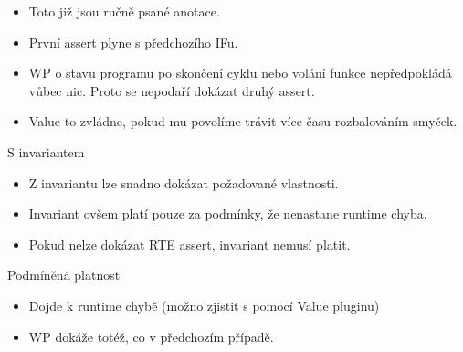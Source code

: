 \documentclass[11pt]{beamer}
\begin{document}
\begin{frame}
	\lstExIIwpItryI
	\begin{itemize}
		\item Toto již jsou ručně psané anotace.
		\item První assert plyne s předchozího IFu.
		\item WP o stavu programu po skončení cyklu nebo volání funkce nepředpokládá vůbec nic. Proto se nepodaří dokázat druhý assert.
		\pause \item Value to zvládne, pokud mu povolíme trávit více času rozbalováním smyček.
	\end{itemize}
\end{frame}


\begin{frame}{S invariantem}
	\lstExIIwpItryII
	\begin{itemize}
			\item Z invariantu lze snadno dokázat požadované vlastnosti.
			\item Invariant ovšem platí pouze za podmínky, že nenastane runtime chyba.
			\item Pokud nelze dokázat RTE assert, invariant nemusí platit.
	\end{itemize}
\end{frame}


\begin{frame}{Podmíněná platnost}
	\lstExIIwpItryIII
	\begin{itemize}
		\item Dojde k runtime chybě (možno zjistit s pomocí Value pluginu)
		\item WP dokáže totéž, co v předchozím případě.
	\end{itemize}
\end{frame}
\end{document}

